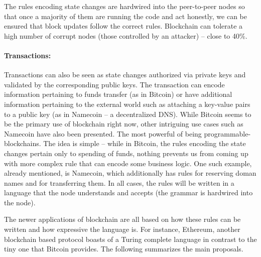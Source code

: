 \documentclass[]{report}   %
\begin{document}
The rules encoding state changes are hardwired into the peer-to-peer nodes so that once a majority of them are running the code and act honestly, we can be ensured that block updates follow the correct rules. Blockchain can tolerate a high number of corrupt nodes (those controlled by an attacker) -- close to 40\%. 

\paragraph{Transactions:} Transactions can also be seen as state changes authorized via private keys and validated by the corresponding public keys. The transaction can encode information pertaining to funds transfer (as in Bitcoin) or have additional information pertaining to the external world such as attaching a key-value pairs to a public key (as in Namecoin -- a decentralized DNS).
While Bitcoin seems to be the primary use of blockchain right now, other intriguing use cases such as Namecoin have also been presented. The most powerful of being programmable-blockchains. The idea is simple -- while in Bitcoin, the rules encoding the state changes pertain only to spending of funds, nothing prevents us from coming up with more complex rule that can encode some business logic. One such example, already mentioned, is Namecoin, which additionally has rules for reserving doman names and for transferring them. In all cases, the rules will be written in a language that the node understands and accepts (the grammar is hardwired into the node). 

The newer applications of blockchain are all based on how these rules can be written and how expressive the language is. For instance, Ethereum, another blockchain based protocol boasts of a Turing complete language in contrast to the tiny one that Bitcoin provides. The following summarizes the main proposals.
\end{document}
